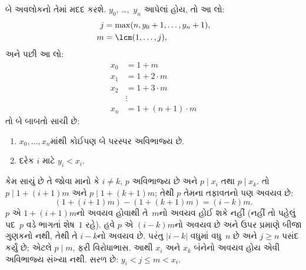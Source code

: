 બે અવલોકનો તેમાં મદદ કરશે.
$y_0$, \dots,~$y_n$ આપેલાં હોય,
તો આ લો:
\begin{align*}
j &= \max(n, y_0 + 1, \dots, y_n + 1), \\
m &= \lcm(1,\dots,j),
\end{align*}
અને પછી આ લો:
\begin{align*}
x_0 & = 1 + m \\
x_1 & = 1 + 2 \cdot m \\
x_2 & = 1 + 3 \cdot m \\
& \vdots  \\
x_n & = 1 + (n+1) \cdot m
\end{align*}
તો બે બાબતો સાચી છે:
\begin{enumerate}
\item{} $x_0,\dots,x_n$માંથી કોઈપણ બે પરસ્પર અવિભાજ્ય છે.
\item{} દરેક $i$ માટે $y_i < x_i$.
\end{enumerate}
 કેમ સાચું છે તે
જોવા માનો કે $i\ne k$, $p$ અવિભાજ્ય
છે અને
$p \mid x_i$ તથા $p \mid x_k$.
તો $p \mid 1 + (i+1) m$ અને
$p \mid 1 + (k+1) m$; તેથી $p$
તેમના તફાવતનો પણ અવયવ છે:
\[
(1 + (i+1)m) - (1+ (k+1)m) = (i-k) m.
\]
$p$ એ $1 + (i+1)m$નો અવયવ
હોવાથી તે~$m$નો અવયવ હોઈ
શકે નહીં (નહીં તો પહેલું પદ~$p$
વડે ભાગતાં શેષ~$1$ રહે).
હવે $p$ એ $(i-k)m$નો અવયવ
છે અને ઉપર પ્રમાણે બીજા
ગુણકનો નથી, તેથી તે
$i-k$નો અવયવ છે. પરંતુ
$\left|i-k\right|$ વધુમાં વધુ~$n$
છે અને $j \geq n$ પસંદ કર્યું છે;
એટલે $p \mid m$, ફરી વિરોધાભાસ.
આથી $x_i$ અને $x_k$ બંનેનો
અવયવ હોય એવી અવિભાજ્ય સંખ્યા નથી.
 સરળ છે:
$y_i < j \leq m < x_i$.

